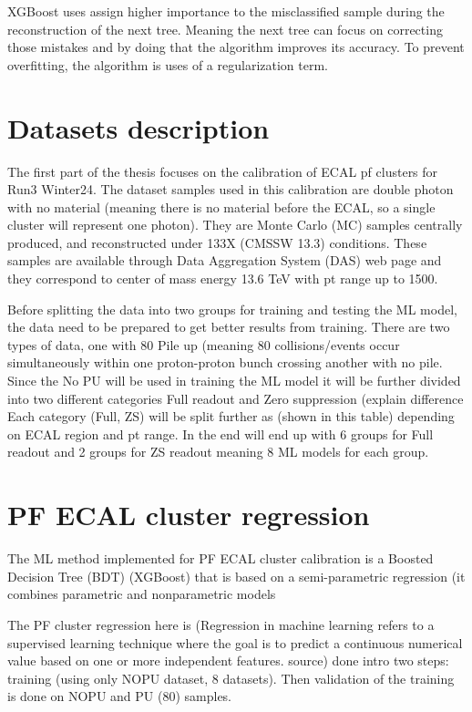XGBoost uses assign higher importance to the misclassified sample during the reconstruction of the next tree. Meaning the next tree can focus on correcting those mistakes and by doing that the algorithm improves its accuracy. To prevent overfitting, the algorithm is uses of a regularization term.


\section{Datasets description}

The first part of the thesis focuses on the calibration of ECAL pf clusters for Run3 Winter24. The dataset samples used in this calibration are double photon with no material (meaning there is no material before the ECAL, so a single cluster will represent one photon). They are Monte Carlo (MC) samples centrally produced, and reconstructed under 133X (CMSSW 13.3) conditions. These samples are available through Data Aggregation System (DAS) web page and they correspond to center of mass energy 13.6 TeV with pt range up to 1500.

Before splitting the data into two groups for training and testing the ML model, the data need to be prepared to get better results from training. There are two types of data, one with 80 Pile up (meaning 80 collisions/events occur simultaneously within one proton-proton bunch crossing %
another with no pile. Since the No PU will be used in training the ML model it will be further divided into two different categories Full readout and Zero suppression (explain difference %
Each category (Full, ZS) will be split further as (shown in this table) depending on ECAL region and pt range. In the end will end up with 6 groups for Full readout and 2 groups for ZS readout meaning 8 ML models for each group.  


\section{PF ECAL cluster regression}
The ML method implemented for PF ECAL cluster calibration is a Boosted Decision Tree (BDT) (XGBoost) that is based on a semi-parametric regression (it combines parametric and nonparametric models %

The PF cluster regression here is (Regression in machine learning refers to a supervised learning technique where the goal is to predict a continuous numerical value based on one or more independent features. source) done intro two steps: training (using only NOPU dataset, 8 datasets). Then validation of the training is done on NOPU and PU (80) samples.

